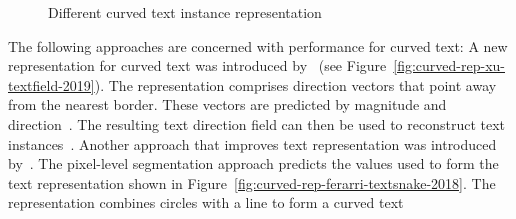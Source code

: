 \begin{figure}[ht]
    \centering\scriptsize
    \caption{%
        Different curved text instance representation\label{fig:curved-text-representations}
    }
\end{figure}
The following approaches are concerned with performance for curved text:
A new representation for curved text was introduced
by~\cite{xu_textfield_2019} (see Figure~\ref{fig:curved-rep-xu-textfield-2019}).
The representation comprises direction vectors that point away from the nearest border.
These vectors are predicted by magnitude and direction~\citep{xu_textfield_2019}.
The resulting text direction field can then be used to reconstruct text
instances~\citep{xu_textfield_2019}.
Another approach that improves text representation was introduced by~\cite{ferrari_textsnake_2018}.
The pixel-level segmentation approach predicts the values used to form the text
representation shown in Figure~\ref{fig:curved-rep-ferarri-textsnake-2018}.
The representation combines circles with a line to form a curved text
